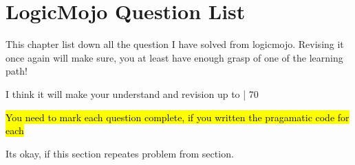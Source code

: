 \chapter{LogicMojo Question List}\label{chp:LogicMojo}

This chapter list down all the question I have solved from logicmojo.
Revising it once again will make sure, you at least have enough grasp of one of the learning path!

I think it will make your understand and revision up to | 70%

\hl{You need to mark each question complete, if you written the pragamatic code for each}


Its okay, if this section repeates problem from section.

